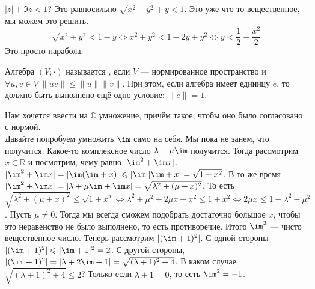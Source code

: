 \documentclass{article}
\begin{document}
\begin{itemize}
\begin{Example}
\begin{center}
            \end{center}
        \end{Example}
        \begin{Example}
            $|z|+\Im z<1$? Это равносильно $\sqrt{x^2+y^2}+y<1$. Это уже что-то вещественное, мы можем это решить.
            \[
            \sqrt{x^2+y^2}<1-y\Leftrightarrow x^2+y^2<1-2y+y^2\Leftrightarrow y<\frac12-\frac{x^2}2
            \]
            Это просто парабола.
        \end{Example}
        \dfn Алгебра $(V;\cdot)$ называется , если $V$ --- нормированное пространство и $\forall u,v\in V~\|uv\|\leqslant\|u\|\|v\|$. При этом, если алгебра имеет единицу $e$, то должно быть выполнено ещё одно условие: $\|e\|=1$.
        \begin{Comment}
            Нам хочется ввести на $\mathbb C$ умножение, причём такое, чтобы оно было согласовано с нормой.\\
            Давайте попробуем умножить $\im$ само на себя. Мы пока не занем, что получится. Какое-то комплексное число $\lambda+\mu\im$ получится. Тогда рассмотрим $x\in\mathbb R$ и посмотрим, чему равно $|\im^2+\im x|$. $|\im^2+\im x|=|\im(\im+x)|\leqslant|\im||\im+x|=\sqrt{1+x^2}$. В то же время $|\im^2+\im x|=|\lambda+\mu\im+\im x|=\sqrt{\lambda^2+(\mu+x)^2}$. То есть $\sqrt{\lambda^2+(\mu+x)^2}\leqslant\sqrt{1+x^2}\Leftrightarrow\lambda^2+\mu^2+2\mu x+x^2\leqslant1+x^2\Leftrightarrow2\mu x\leqslant1-\lambda^2-\mu^2$. Пусть $\mu\neq0$. Тогда мы всегда сможем подобрать достаточно большое $x$, чтобы это неравенство не было выполнено, то есть противоречие. Итого $\im^2$ --- чисто вещественное число. Теперь рассмотрим $|(\im+1)^2|$. С одной стороны --- $|(\im+1)^2|\leqslant|\im+1|^2=2$. С другой стороны, $|(\im+1)^2|=|\lambda+2\im+1|=\sqrt{(\lambda+1)^2+4}$. В каком случае $\sqrt{(\lambda+1)^2+4}\leqslant2$? Только если $\lambda+1=0$, то есть $\im^2=-1$.

\end{Comment}
\end{itemize}
\end{document}
